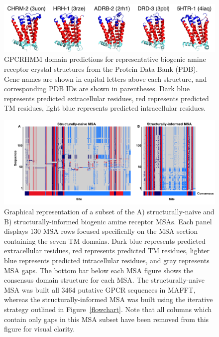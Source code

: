 \documentclass[fleqn,10pt]{wlpeerj}
\begin{document}
\begin{figure}[htbp]
	\centerline{\includegraphics[width=15cm]{figures/pdb_gpcrhmm.pdf}}
	\caption{\label{pdb_gpcrhmm} GPCRHMM domain predictions for representative biogenic amine receptor crystal structures from the Protein Data Bank (PDB). Gene names are shown in capital letters above each structure, and corresponding PDB IDs are shown in parentheses. Dark blue represents predicted extracellular residues, red represents predicted TM residues, light blue represents predicted intracellular residues.}
\end{figure}



\vspace*{2cm}

\begin{figure}[htbp]
	\centerline{\includegraphics[width=8in]{figures/domains_naive_struc.png}}
	\caption{\label{domains} Graphical representation of a subset of the A) structurally-naive and B) structurally-informed biogenic amine receptor MSAs. Each panel displays 130 MSA rows focused specifically on the MSA section containing the seven TM domains. Dark blue represents predicted extracellular residues, red represents predicted TM residues, lighter blue represents predicted intracellular residues, and gray represents MSA gaps. The bottom bar below each MSA figure shows the consensus domain structure for each MSA. The structurally-naive MSA was built all 3464 putative GPCR sequences in MAFFT, whereas the structurally-informed MSA was built using the iterative strategy outlined in Figure~\ref{flowchart}. Note that all columns which contain only gaps in this MSA subset have been removed from this figure for visual clarity.}
\end{figure}
\end{document}
